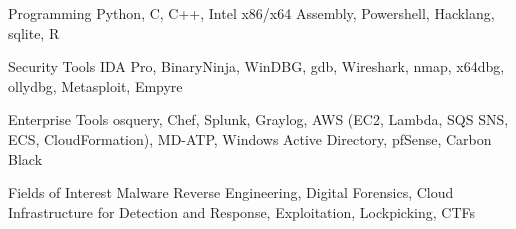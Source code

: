 


\begin{cvskills}


\cvskill
{Programming} %
{Python, C, C++, Intel x86/x64 Assembly, Powershell, Hacklang, sqlite, R} %


\cvskill
{Security Tools} %
{IDA Pro, BinaryNinja, WinDBG, gdb, Wireshark, nmap, x64dbg, ollydbg, Metasploit, Empyre} %


\cvskill
{Enterprise Tools} %
{osquery, Chef, Splunk, Graylog, AWS (EC2, Lambda, SQS SNS, ECS, CloudFormation), MD-ATP, Windows Active Directory, pfSense, Carbon Black} %


\cvskill
{Fields of Interest} %
{Malware Reverse Engineering, Digital Forensics, Cloud Infrastructure for Detection and Response, Exploitation, Lockpicking, CTFs} %


\end{cvskills}
